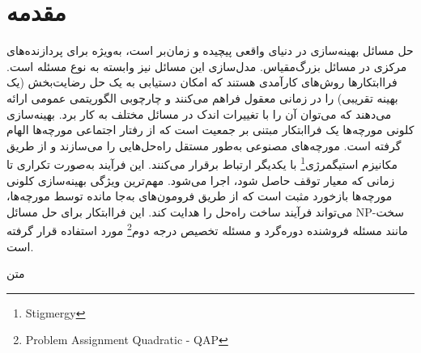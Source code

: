 \documentclass[a4paper,10pt]{article}
\begin{document}

    \section{مقدمه}

        حل مسائل بهینه‌سازی در دنیای واقعی پیچیده و زمان‌بر است، به‌ویژه برای پردازنده‌های مرکزی در مسائل بزرگ‌مقیاس. مدل‌سازی این مسائل نیز وابسته به نوع مسئله است. فراابتکارها روش‌های کارآمدی هستند که امکان دستیابی به یک حل رضایت‌بخش (یک بهینه تقریبی) را در زمانی معقول فراهم می‌کنند و چارچوبی الگوریتمی عمومی ارائه می‌دهند که می‌توان آن را با تغییرات اندک در مسائل مختلف به کار برد. بهینه‌سازی کلونی مورچه‌ها یک فراابتکار مبتنی بر جمعیت است که از رفتار اجتماعی مورچه‌ها الهام گرفته است. مورچه‌های مصنوعی به‌طور مستقل راه‌حل‌هایی را می‌سازند و از طریق مکانیزم استیگمرژی\footnote{\hspace{2pt}Stigmergy} با یکدیگر ارتباط برقرار می‌کنند. این فرآیند به‌صورت تکراری تا زمانی که معیار توقف حاصل شود، اجرا می‌شود. مهم‌ترین ویژگی بهینه‌سازی کلونی مورچه‌ها بازخورد مثبت است که از طریق فرومون‌های به‌جا مانده توسط مورچه‌ها، می‌تواند فرآیند ساخت راه‌حل را هدایت کند. این فراابتکار برای حل مسائل NP-سخت مانند مسئله فروشنده دوره‌گرد و مسئله تخصیص درجه دوم\footnote{\hspace{2pt}Problem Assignment Quadratic - QAP} مورد استفاده قرار گرفته است.

        متن
\end{document}
